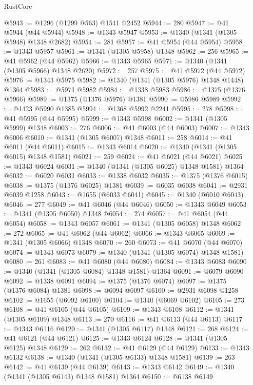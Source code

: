 \begin{lexlean}{RustCore}
\begin{coremodule}
@5943 := @1296 (@1299 @563) @1541 @2452
@5944 := 280
@5947 := @41 @5944 (@44 @5944)
@5948 := @1343 @5947
@5953 := @1340 (@1341 (@1305 @5948) @1348 @2682)
@5954 := 281
@5957 := @41 @5954 (@44 @5954)
@5958 := @1343 @5957
@5961 := @1341 (@1305 @5958) @1348
@5962 := 256
@5965 := @41 @5962 (@44 @5962)
@5966 := @1343 @5965
@5971 := @1340 (@1341 (@1305 @5966) @1348 @2620)
@5972 := 257
@5975 := @41 @5972 (@44 @5972)
@5976 := @1343 @5975
@5982 := @1340 (@1341 (@1305 @5976) @1348 @1448) @1364
@5983 := @5971 @5982
@5984 := @1338 @5983
@5986 := @1375 (@1376 @5966)
@5989 := @1375 (@1376 @5976) @1381
@5990 := @5986 @5989
@5992 := @1423 @5990 @1385
@5994 := @1368 @5992 @2241
@5995 := 278
@5998 := @41 @5995 (@44 @5995)
@5999 := @1343 @5998
@6002 := @1341 (@1305 @5999) @1348
@6003 := 276
@6006 := @41 @6003 (@44 @6003)
@6007 := @1343 @6006
@6010 := @1341 (@1305 @6007) @1348
@6011 := 258
@6014 := @41 @6011 (@44 @6011)
@6015 := @1343 @6014
@6020 := @1340 (@1341 (@1305 @6015) @1348 @1581)
@6021 := 259
@6024 := @41 @6021 (@44 @6021)
@6025 := @1343 @6024
@6031 := @1340 (@1341 (@1305 @6025) @1348 @1581) @1364
@6032 := @6020 @6031
@6033 := @1338 @6032
@6035 := @1375 (@1376 @6015)
@6038 := @1375 (@1376 @6025) @1381
@6039 := @6035 @6038
@6041 := @2931 @6039 @1258
@6043 := @1655 (@6033 @6041)
@6045 := @1340 (@6010 @6043)
@6046 := 277
@6049 := @41 @6046 (@44 @6046)
@6050 := @1343 @6049
@6053 := @1341 (@1305 @6050) @1348
@6054 := 274
@6057 := @41 @6054 (@44 @6054)
@6058 := @1343 @6057
@6061 := @1341 (@1305 @6058) @1348
@6062 := 272
@6065 := @41 @6062 (@44 @6062)
@6066 := @1343 @6065
@6069 := @1341 (@1305 @6066) @1348
@6070 := 260
@6073 := @41 @6070 (@44 @6070)
@6074 := @1343 @6073
@6079 := @1340 (@1341 (@1305 @6074) @1348 @1581)
@6080 := 261
@6083 := @41 @6080 (@44 @6080)
@6084 := @1343 @6083
@6090 := @1340 (@1341 (@1305 @6084) @1348 @1581) @1364
@6091 := @6079 @6090
@6092 := @1338 @6091
@6094 := @1375 (@1376 @6074)
@6097 := @1375 (@1376 @6084) @1381
@6098 := @6094 @6097
@6100 := @2931 @6098 @1258
@6102 := @1655 (@6092 @6100)
@6104 := @1340 (@6069 @6102)
@6105 := 273
@6108 := @41 @6105 (@44 @6105)
@6109 := @1343 @6108
@6112 := @1341 (@1305 @6109) @1348
@6113 := 270
@6116 := @41 @6113 (@44 @6113)
@6117 := @1343 @6116
@6120 := @1341 (@1305 @6117) @1348
@6121 := 268
@6124 := @41 @6121 (@44 @6121)
@6125 := @1343 @6124
@6128 := @1341 (@1305 @6125) @1348
@6129 := 262
@6132 := @41 @6129 (@44 @6129)
@6133 := @1343 @6132
@6138 := @1340 (@1341 (@1305 @6133) @1348 @1581)
@6139 := 263
@6142 := @41 @6139 (@44 @6139)
@6143 := @1343 @6142
@6149 := @1340 (@1341 (@1305 @6143) @1348 @1581) @1364
@6150 := @6138 @6149

\end{coremodule}
\end{lexlean}
